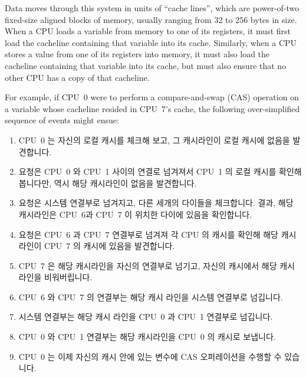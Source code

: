 Data moves through this system in units of ``cache lines'', which
are power-of-two fixed-size aligned blocks of memory, usually ranging
from 32 to 256 bytes in size.
When a CPU loads a variable from memory to one of its registers, it must
first load the cacheline containing that variable into its cache.
Similarly, when a CPU stores a value from one of its registers into
memory, it must also load the cacheline containing that variable into
its cache, but must also ensure that no other CPU has a copy of that
cacheline.

For example, if CPU~0 were to perform a compare-and-swap (CAS) operation on a
variable whose cacheline resided in CPU~7's cache, the following
over-simplified sequence of events might ensue:
\fi

\begin{enumerate}
\item	CPU~0 는 자신의 로컬 캐시를 체크해 보고, 그 캐시라인이 로컬 캐시에
	없음을 발견합니다.
\item	요청은 CPU~0 와 CPU~1 사이의 연결로 넘겨져서 CPU~1 의 로컬 캐시를
	확인해봅니다만, 역시 해당 캐시라인이 없음을 발견합니다.
\item	요청은 시스템 연결부로 넘겨지고, 다른 세개의 다이들을 체크합니다. 결과,
	해당 캐시라인은 CPU~6과 CPU~7 이 위치한 다이에 있음을 확인합니다.
\item	요청은 CPU~6 과 CPU~7 연결부로 넘겨져 각 CPU 의 캐시를 확인해 해당 캐시
	라인이 CPU~7 의 캐시에 있음을 발견합니다.
\item	CPU~7 은 해당 캐시라인을 자신의 연결부로 넘기고, 자신의 캐시에서 해당
	캐시라인을 비워버립니다.
\item	CPU~6 와 CPU~7 의 연결부는 해당 캐시 라인을 시스템 연결부로 넘깁니다.
\item	시스템 연결부는 해당 캐시 라인을 CPU~0 과 CPU~1 연결부로 넘깁니다.
\item	CPU~0 와 CPU~1 연결부는 해당 캐시라인을 CPU~0 의 캐시로 보냅니다.
\item	CPU~0 는 이제 자신의 캐시 안에 있는 변수에 CAS 오퍼레이션을 수행할 수
	있습니다.
\iffalse


\end{enumerate}

